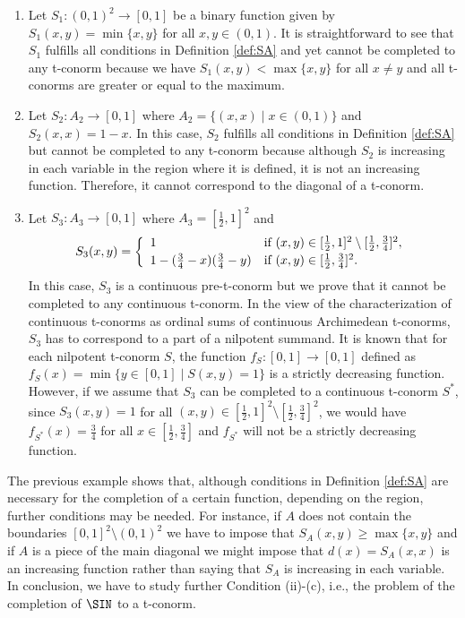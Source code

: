 \begin{example}
	\begin{enumerate}[label=(\roman*)]
		\item Let $S_1:(0,1)^2 \to [0,1]$ be a binary function given by $S_1(x,y)=\min\{x,y\}$ for all $x,y \in (0,1)$. It is straightforward to see that $S_1$ fulfills all conditions in Definition \ref{def:SA} and yet cannot be completed to any t-conorm because we have $S_1(x,y) < \max \{x,y\}$ for all $x\neq y$  and all t-conorms are greater or equal to the maximum.
		\item Let $S_2:A_2 \to [0,1]$ where $A_2 = \{(x,x) \mid x \in (0,1)\}$ and $S_2(x,x)=1-x$. In this case, $S_2$ fulfills all conditions in Definition \ref{def:SA} but cannot be completed to any t-conorm because although $S_2$ is increasing in each variable in the region where it is defined, it is not an increasing function. Therefore, it cannot correspond to the diagonal of a t-conorm.
		\item Let $S_3:A_3 \to [0,1]$ where $A_3 = [\frac{1}{2},1]^2$ and
		$$
		S_3(x,y)
		=
		\left\{ \begin{array}{ll}
			1 &   \text{if }   (x,y) \in [\frac{1}{2},1]^2 \setminus [\frac{1}{2},\frac{3}{4}]^2, \\[2pt]
			1-(\frac{3}{4}-x)(\frac{3}{4}-y) & \text{if } (x,y) \in [\frac{1}{2},\frac{3}{4}]^2.
		\end{array} \right. \\
		$$
		In this case, $S_3$ is a continuous pre-t-conorm but we prove that it cannot be completed to any continuous t-conorm. In the view of the characterization of continuous t-conorms as ordinal sums of continuous Archimedean t-conorms, $S_3$ has to correspond to a part of a nilpotent summand. It is known that for each nilpotent t-conorm $S$, the function $f_S : [0,1] \to [0,1]$ defined as $f_S(x) = \min \{y \in [0,1] \mid S(x,y)=1\}$ is a strictly decreasing function. However, if we assume that $S_3$ can be completed to a continuous t-conorm $S^*$, since $S_3(x,y)=1$ for all $(x,y) \in [\frac{1}{2},1]^2 \setminus [\frac{1}{2},\frac{3}{4}]^2$,  we would have $f_{S^*}(x)=\frac{3}{4}$ for all $ x \in [\frac{1}{2},\frac{3}{4}]$ and $f_{S^*}$ will not be a strictly decreasing function.
	\end{enumerate}
\end{example}

The previous example shows that, although conditions in Definition \ref{def:SA} are necessary for the completion of a certain function, depending on the region, further conditions may be needed. For instance, if $A$ does not contain the boundaries $[0,1]^2\setminus (0,1)^2$ we have to impose that $S_A(x,y) \geq \max \{x,y\}$ and if $A$ is a piece of the main diagonal we might impose that $d(x)=S_A(x,x)$ is an increasing function rather than saying that $S_A$ is increasing in each variable. In conclusion, we have to study further Condition (ii)-(c), i.e., the problem of the completion of $\SIN$ to a t-conorm.


